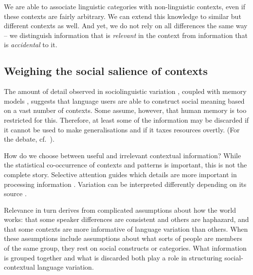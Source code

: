 \documentclass{frontiersSCNS} %
\begin{document}

 
We are able to associate linguistic categories with non-linguistic contexts, even if these contexts are fairly arbitrary. We can extend this knowledge to similar but different contexts as well. And yet, we do not rely on all differences the same way -- we distinguish information that is \emph{relevant} in the context from information that is \emph{accidental} to it.


\subsection{Weighing the social salience of contexts}

The amount of detail observed in sociolinguistic variation \citep{hay2007sociophonetics}, coupled with memory models \citep{nosofsky1988exemplar}, suggests that language users are able to construct social meaning based on a vast number of contexts. Some assume, however, that human memory is too restricted for this. Therefore, at least some of the information may be discarded if it cannot be used to make generalisations and if it taxes resources overtly. (For the debate, cf.\ \citealt{baayen2011sidestepping,gluck2001gateway,denton2008rule}). 

How do we choose between useful and irrelevant contextual information? While the statistical co-occurrence of contexts and patterns is important, this is not the complete story. Selective attention guides which details are more important in processing information \citep{itti1998model}. Variation can be interpreted differently depending on its source \citep{kraljic2008accommodating}. 

Relevance in turn derives from complicated assumptions about how the world works: that some speaker differences are consistent and others are haphazard, and that some contexts are more informative of language variation than others. When these assumptions include assumptions about what sorts of people
are members of the same group, they rest on social constructs or categories. What information is grouped together and what is discarded both play a role in structuring social-contextual language variation. 
\end{document}
